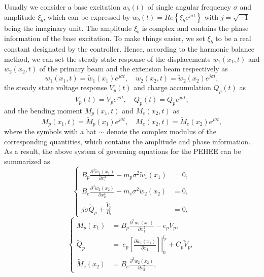 \documentclass{elsarticle}
\begin{document}
Usually we consider a base excitation $w_b(t)$ of single angular frequency $\sigma$ and amplitude $\xi_b$, which can be expressed by $w_b(t) = Re \left\{ \xi_b e^{j \sigma t} \right\}$ with $j = \sqrt{-1}$ being the imaginary unit. The amplitude $\xi_b$ is complex and contains the phase information of the base excitation. To make things easier, we set $\xi_b$ to be a real constant designated by the controller. Hence, according to the harmonic balance method, we can set the steady state response of the displacements $w_1(x_1,t)$ and $w_2(x_2,t)$ of the primary beam and the extension beam respectively as 
\begin{equation}
    w_1(x_1,t) = \tilde{w}_1(x_1)e^{j \sigma t},\quad w_2(x_2,t) = \tilde{w}_2(x_2)e^{j \sigma t},
\end{equation}
the steady state voltage response $V_p(t)$ and charge accumulation $Q_p(t)$ as
\begin{equation}
    V_p(t) = \tilde{V}_p e^{j \sigma t},\quad Q_p(t) = \tilde{Q}_p e^{j \sigma t},
\end{equation}
and the bending moment $M_p(x_1,t)$ and $M_e(x_2,t)$ as
\begin{equation}
    M_p(x_1,t) = \tilde{M}_p(x_1) e^{j \sigma t},\quad M_e(x_2,t) = \tilde{M}_e(x_2) e^{j \sigma t},
\end{equation}
where the symbols with a hat $\sim$ denote the complex modulus of the corresponding quantities, which contains the amplitude and phase information. As a result, the above system of governing equations for the PEHEE can be summarized as
\begin{equation}
    \left\{\begin{aligned}
        B_p \frac{\partial^4 \tilde{w}_1(x_1)}{\partial x_1^4} - m_p \sigma^2 \tilde{w}_1(x_1) &= 0, \\
        B_e \frac{\partial^4 \tilde{w}_2(x_2)}{\partial x_2^4} - m_e \sigma^2 \tilde{w}_2(x_2) &= 0, \\
        j \sigma \tilde{Q}_p + \frac{\tilde{V}_p}{R_l} &= 0,
    \end{aligned}\right.
    \label{eq:eq_balance_equations_original}
\end{equation}
\begin{equation}
    \left\{\begin{aligned}
        \tilde{M}_p(x_1) &= B_p \frac{\partial^2 \tilde{w}_1(x_1)}{\partial x_1^2} - e_p \tilde{V}_p, \\
        \tilde{Q}_p &= \ e_p \left.\left[ \frac{\partial \tilde{w}_1(x_1)}{\partial x_1} \right]\right|^{l_p}_0 + C_p \tilde{V}_p, \\
        \tilde{M}_e(x_2) &= B_e \frac{\partial^2 \tilde{w}_2(x_2)}{\partial x_2^2},
    \end{aligned}\right.
    \label{eq:eq_constitutive_equations_original}
\end{equation}
\end{document}
